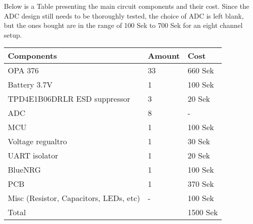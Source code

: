 Below is a Table presenting the main circuit components and their cost. Since the ADC  design still needs to be thoroughly tested, the choice of ADC is left blank, but the ones bought are in the range of 100 Sek to 700 Sek for an eight channel setup.
\begin{table}[H]
\begin{tabular}{|l|l|l|}
\hline
Components                             & Amount & Cost     \\ \hline
OPA 376                                & 33     & 660 Sek  \\ \hline
Battery 3.7V                           & 1      & 100 Sek  \\ \hline
TPD4E1B06DRLR ESD suppressor           & 3      & 20 Sek   \\ \hline
ADC                                    & 8      & -        \\ \hline
MCU                                    & 1      & 100 Sek  \\ \hline
Voltage regualtro                      & 1      & 30 Sek   \\ \hline
UART isolator                          & 1      & 20 Sek   \\ \hline
BlueNRG                                & 1      & 100 Sek  \\ \hline
PCB                                    & 1      & 370 Sek  \\ \hline
Misc (Resistor, Capacitors, LEDs, etc) & -      & 100 Sek  \\ \hline
Total                                  &        & 1500 Sek \\ \hline
\end{tabular}
\end{table}